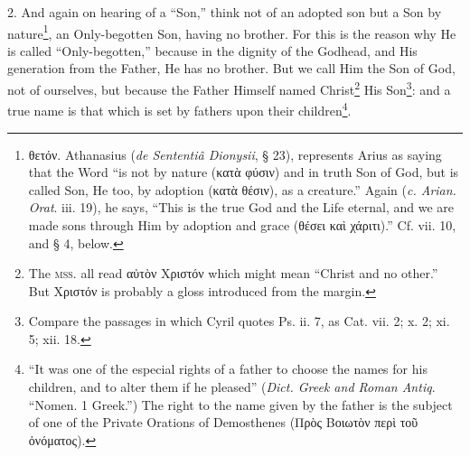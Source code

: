2. And again on hearing of a “Son,” think not of an adopted son but a Son by nature\footnote{\textgreek{θετόν}. Athanasius (\emph{de Sententiâ Dionysii}, § 23), represents Arius as saying that the Word “is not by nature (\textgreek{κατὰ φύσιν}) and in truth Son of God, but is called Son, He too, by adoption (\textgreek{κατὰ θέσιν}), as a creature.” Again (\emph{c. Arian. Orat}. iii. 19), he says, “This is the true God and the Life eternal, and we are made sons through Him by adoption and grace (\textgreek{θέσει καὶ χάριτι}).” Cf. vii. 10, and § 4, below.}, an Only-begotten Son, having no brother. For this is the reason why He is called “Only-begotten,” because in the dignity of the Godhead, and His generation from the Father, He has no brother. But we call Him the Son of God, not of ourselves, but because the Father Himself named Christ\footnote{The \textsc{mss.} all read \textgreek{αὐτὸν Χριστόν} which might mean “Christ and no other.” But \textgreek{Χριστόν} is probably a gloss introduced from the margin.} His Son\footnote{Compare the passages in which Cyril quotes Ps. ii. 7, as Cat. vii. 2; x. 2; xi. 5; xii. 18.}: and a true name is that which is set by fathers upon their children\footnote{“It was one of the especial rights of a father to choose the names for his children, and to alter them if he pleased” (\emph{Dict. Greek and Roman Antiq}. “Nomen. 1 Greek.”) The right to the name given by the father is the subject of one of the Private Orations of Demosthenes (\textgreek{Πρὸς Βοιωτὸν περὶ τοῦ ὀνόματος}).}.

